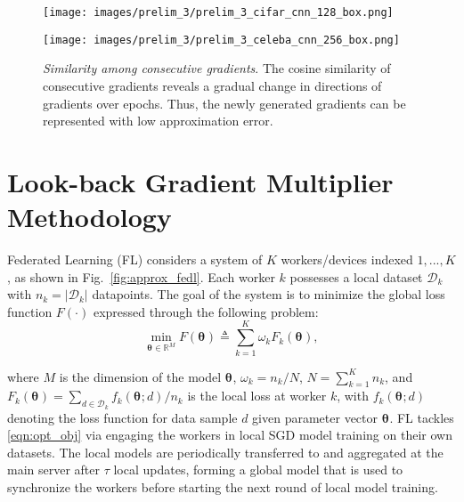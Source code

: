 \documentclass{article}
\newcommand{\shams}[1]{{\color{red}{#1}}}
\renewcommand{\shams}[1]{{\color{black}{#1}}}
\renewcommand{\vec}[3]{\boldsymbol{#1}_{#2}^{#3}}
\newcommand{\eqn}[1]{{\begin{equation}#1\end{equation}}}
\newcommand{\algFullName}{Look-back Gradient Multiplier}
\begin{document}
\begin{figure}[t]
\centering
\begin{minipage}{.495\textwidth}
  \centering
  \centerline{\texttt{[image: images/prelim\_3/prelim\_3\_cifar\_cnn\_128\_box.png]}}
\end{minipage}
\begin{minipage}{.495\textwidth}
  \centering
  \vspace{2mm}
  \centerline{\texttt{[image: images/prelim\_3/prelim\_3\_celeba\_cnn\_256\_box.png]}}
\end{minipage}
    \vspace{-4mm}
  \caption{\small{\textit{Similarity among consecutive gradients}. The cosine similarity  of consecutive gradients reveals a gradual change in directions of gradients over epochs. 
Thus,
  the newly generated gradients can be represented \shams{in terms of the previously generated gradients} with low approximation error. \shams{Reusing/recycling gradients can thus lead to significant communication savings during SGD-based  federated optimization.}
}}
  \label{fig:prelim_3}
    \vspace{-2mm}
\end{figure}



\vspace{-2.5mm}
\section{{\algFullName} Methodology}
\label{sec:method}
\vspace{-1.5mm}

Federated Learning (FL) considers a system of $K$ workers/devices indexed $1,...,K$, as shown in Fig.~\ref{fig:approx_fedl}. Each worker $k$ possesses a local dataset $\mathcal{D}_k$ with $n_k = |\mathcal{D}_k|$ datapoints. The goal of the system is to minimize the global loss function $F(\cdot)$ expressed through the following problem:
\eqn{
    \min_{\vec{\theta}{}{} \in \mathbb{R}^{M}}  F(\vec{\theta}{}{}) \triangleq \sum_{k=1}^K\omega_k F_k(\vec{\theta}{}{}){}{},
    \label{eqn:opt_obj}
}

\noindent where $M$ is the dimension of the model $\vec{\theta}{}{}$, $\omega_k=n_k/N$, $N=\sum_{k=1}^K n_k$, and $F_k(\vec{\theta}{}{}) = \sum_{d \in \mathcal{D}_k}f_k(\vec{\theta}{}{};d)/n_k$ is the local loss at worker $k$, with $f_k(\vec{\theta}{}{};d)$ denoting the loss function for data sample $d$ given parameter vector $\vec{\theta}{}{}$. FL tackles \eqref{eqn:opt_obj} via engaging the workers in local SGD model training on their own datasets. The local models are periodically transferred to and aggregated at the main server after $\tau$ local updates, forming a global model that is used to synchronize the workers before starting the next round of local model training.
\end{document}
